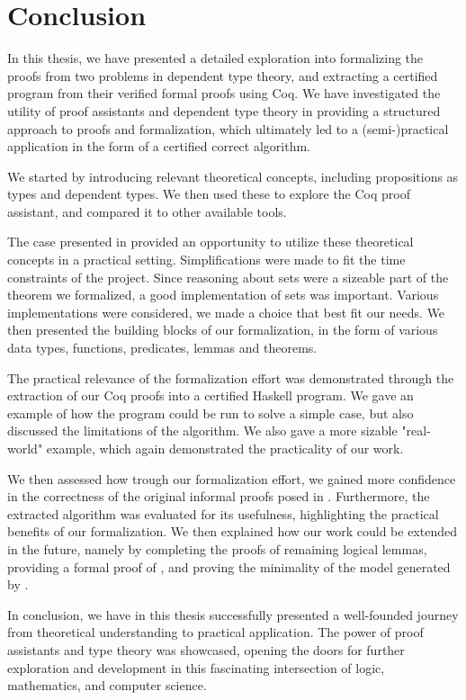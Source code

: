 \chapter{Conclusion}

In this thesis, we have presented a detailed exploration into formalizing
the proofs from two problems in dependent type theory,
and extracting a certified program from their verified formal proofs using Coq.
We have investigated the utility of proof assistants and dependent type theory
in providing a structured approach to proofs and formalization,
which ultimately led to a (semi-)practical application
in the form of a certified correct algorithm.

We started by introducing relevant theoretical concepts,
including propositions as types and dependent types.
We then used these to explore the Coq proof assistant,
and compared it to other available tools.

The case presented in 
provided an opportunity to utilize these theoretical concepts in a practical setting.
Simplifications were made to fit the time constraints of the project.
Since reasoning about sets were a sizeable part of the theorem we formalized,
a good implementation of sets was important.
Various implementations were considered, we made a choice that best fit our needs.
We then presented the building blocks of our formalization,
in the form of various data types, functions, predicates, lemmas and theorems.

The practical relevance of the formalization effort was demonstrated through the extraction
of our Coq proofs into a certified Haskell program.
We gave an example of how the program could be run to solve a simple case,
but also discussed the limitations of the algorithm.
We also gave a more sizable "real-world" example, which again
demonstrated the practicality of our work.

We then assessed how trough our formalization effort,
we gained more confidence in the correctness of the original informal proofs posed in \cite{mbezem}.
Furthermore, the extracted algorithm was evaluated for its usefulness,
highlighting the practical benefits of our formalization.
We then explained how our work could be extended in the future,
namely by completing the proofs of remaining logical lemmas,
providing a formal proof of , and proving the minimality of the model generated by .

In conclusion, we have in this thesis successfully presented
a well-founded journey from theoretical understanding to practical application.
The power of proof assistants and type theory was showcased,
opening the doors for further exploration and development in this
fascinating intersection of logic, mathematics, and computer science.

